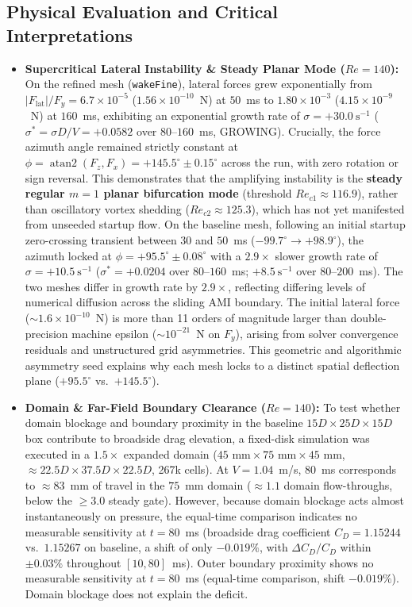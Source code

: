 \documentclass[11pt,a4paper]{article}
\begin{document}
\subsection{Physical Evaluation and Critical Interpretations}
\begin{itemize}
    \item \textbf{Supercritical Lateral Instability \& Steady Planar Mode ($Re = 140$):} On the refined mesh (\texttt{wakeFine}), lateral forces grew exponentially from $|F_{\mathrm{lat}}|/F_y = 6.7 \times 10^{-5}$ ($1.56 \times 10^{-10}$~N) at $50$~ms to $1.80 \times 10^{-3}$ ($4.15 \times 10^{-9}$~N) at $160$~ms, exhibiting an exponential growth rate of $\sigma = +30.0\ \mathrm{s}^{-1}$ ($\sigma^* = \sigma D / V = +0.0582$ over $80$--$160$~ms, GROWING). Crucially, the force azimuth angle remained strictly constant at $\phi = \operatorname{atan2}(F_z, F_x) = +145.5^\circ \pm 0.15^\circ$ across the run, with zero rotation or sign reversal. This demonstrates that the amplifying instability is the \textbf{steady regular $m = 1$ planar bifurcation mode} (threshold $Re_{c1} \approx 116.9$), rather than oscillatory vortex shedding ($Re_{c2} \approx 125.3$), which has not yet manifested from unseeded startup flow. On the baseline mesh, following an initial startup zero-crossing transient between $30$ and $50$~ms ($-99.7^\circ \to +98.9^\circ$), the azimuth locked at $\phi = +95.5^\circ \pm 0.08^\circ$ with a $2.9\times$ slower growth rate of $\sigma = +10.5\ \mathrm{s}^{-1}$ ($\sigma^* = +0.0204$ over $80$--$160$~ms; $+8.5\ \mathrm{s}^{-1}$ over $80$--$200$~ms). The two meshes differ in growth rate by $2.9\times$, reflecting differing levels of numerical diffusion across the sliding AMI boundary. The initial lateral force ($\sim 1.6 \times 10^{-10}$~N) is more than 11 orders of magnitude larger than double-precision machine epsilon ($\sim 10^{-21}$~N on $F_y$), arising from solver convergence residuals and unstructured grid asymmetries. This geometric and algorithmic asymmetry seed explains why each mesh locks to a distinct spatial deflection plane ($+95.5^\circ$ vs.\ $+145.5^\circ$).
    \item \textbf{Domain \& Far-Field Boundary Clearance ($Re = 140$):} To test whether domain blockage and boundary proximity in the baseline $15D \times 25D \times 15D$ box contribute to broadside drag elevation, a fixed-disk simulation was executed in a $1.5\times$ expanded domain ($45\text{ mm} \times 75\text{ mm} \times 45\text{ mm}$, $\approx 22.5D \times 37.5D \times 22.5D$, 267k cells). At $V = 1.04$~m/s, $80$~ms corresponds to $\approx 83$~mm of travel in the $75$~mm domain ($\approx 1.1$ domain flow-throughs, below the $\ge 3.0$ steady gate). However, because domain blockage acts almost instantaneously on pressure, the equal-time comparison indicates no measurable sensitivity at $t = 80$~ms (broadside drag coefficient $C_D = 1.15244$ vs.\ $1.15267$ on baseline, a shift of only $\mathbf{-0.019\%}$, with $\Delta C_D / C_D$ within $\pm 0.03\%$ throughout $[10, 80]$~ms). Outer boundary proximity shows no measurable sensitivity at $t = 80$~ms (equal-time comparison, shift $-0.019\%$). Domain blockage does not explain the deficit.

\end{itemize}
\end{document}
